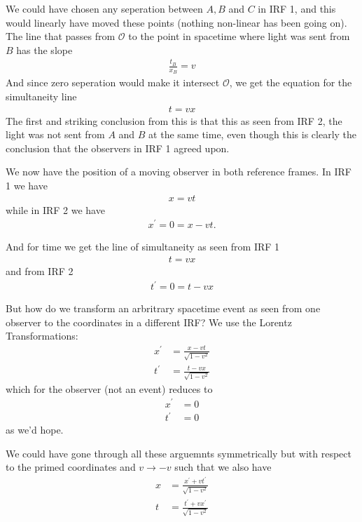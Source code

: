 \documentclass[a4paper]{article}
\begin{document}
   We could have chosen any seperation between \(A, B\) and \(C\) in IRF 1, and this would linearly have moved these points (nothing non-linear has been going on). The line that passes from \(\mathcal{O}\) to the point in spacetime where light was sent from \(B\) has the slope \begin{align*}
    \frac{t_B}{x_B} = v
   \end{align*} 
   And since zero seperation would make it intersect \(\mathcal{O}\), we get the equation for the simultaneity line \begin{align*}
    t = vx
   \end{align*}
   The first and striking conclusion from this is that this as seen from IRF 2, the light was not sent from \(A\) and \(B\) at the same time, even though this is clearly the conclusion that the observers in IRF 1 agreed upon.   

   We now have the position of a moving observer in both reference frames. In IRF 1 we have 
   \begin{align*}
    x = vt
   \end{align*}
   while in IRF 2 we have \begin{align*}
    x^{\prime} = 0 = x - vt.
   \end{align*}

   And for time we get the line of simultaneity as seen from IRF 1 \begin{align*}
    t = vx
   \end{align*}
   and from IRF 2 \begin{align*}
    t^{\prime} = 0 = t - vx
   \end{align*}

   But how do we transform an arbritrary spacetime event as seen from one observer to the coordinates in a different IRF? We use the Lorentz Transformations: \begin{align*}
    x ^{\prime} &= \frac{x - vt}{\sqrt{1 - v^{2}} }\\
    t^{\prime} &= \frac{t - vx}{\sqrt{1 - v^{2}} }
   \end{align*}
   which for the observer (not an event) reduces to \begin{align*}
    x^{\prime} &= 0\\
    t^{\prime} &= 0
   \end{align*}
   as we'd hope. 

   We could have gone through all these arguemnts symmetrically but with respect to the primed coordinates and \(v \to -v\) such that we also have \begin{align*}
    x &= \frac{x^{\prime} + vt^{\prime} }{\sqrt{1 - v^{2}} }\\
    t &= \frac{t^{\prime}  + vx^{\prime} }{\sqrt{1 - v^{2}} }
   \end{align*} 
   
\end{document}
